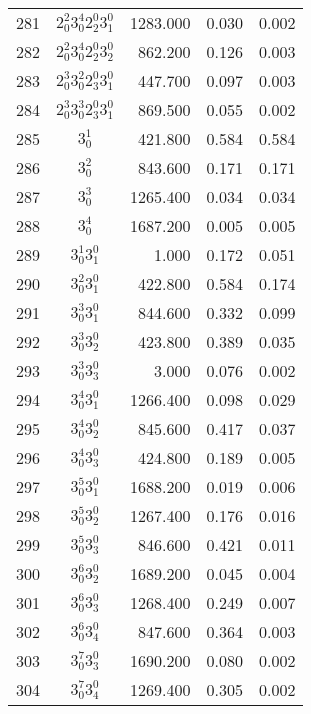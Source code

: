 \documentclass[12pt]{article}
\begin{document}
\begin{table}
\begin{tabular}{rcrrr}
281&$2_0^2 3_0^4 2_2^0 3_1^0$& 1283.000& 0.030& 0.002\\
282&$2_0^2 3_0^4 2_2^0 3_2^0$& 862.200& 0.126& 0.003\\
283&$2_0^3 3_0^2 2_3^0 3_1^0$& 447.700& 0.097& 0.003\\
284&$2_0^3 3_0^3 2_3^0 3_1^0$& 869.500& 0.055& 0.002\\
285&$3_0^1$& 421.800& 0.584& 0.584\\
286&$3_0^2$& 843.600& 0.171& 0.171\\
287&$3_0^3$& 1265.400& 0.034& 0.034\\
288&$3_0^4$& 1687.200& 0.005& 0.005\\
289&$3_0^1 3_1^0$& 1.000& 0.172& 0.051\\
290&$3_0^2 3_1^0$& 422.800& 0.584& 0.174\\
291&$3_0^3 3_1^0$& 844.600& 0.332& 0.099\\
292&$3_0^3 3_2^0$& 423.800& 0.389& 0.035\\
293&$3_0^3 3_3^0$& 3.000& 0.076& 0.002\\
294&$3_0^4 3_1^0$& 1266.400& 0.098& 0.029\\
295&$3_0^4 3_2^0$& 845.600& 0.417& 0.037\\
296&$3_0^4 3_3^0$& 424.800& 0.189& 0.005\\
297&$3_0^5 3_1^0$& 1688.200& 0.019& 0.006\\
298&$3_0^5 3_2^0$& 1267.400& 0.176& 0.016\\
299&$3_0^5 3_3^0$& 846.600& 0.421& 0.011\\
300&$3_0^6 3_2^0$& 1689.200& 0.045& 0.004\\
301&$3_0^6 3_3^0$& 1268.400& 0.249& 0.007\\
302&$3_0^6 3_4^0$& 847.600& 0.364& 0.003\\
303&$3_0^7 3_3^0$& 1690.200& 0.080& 0.002\\
304&$3_0^7 3_4^0$& 1269.400& 0.305& 0.002\\
\end{tabular}
\end{table}
\end{document}
